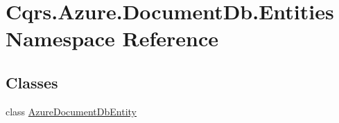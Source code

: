 \hypertarget{namespaceCqrs_1_1Azure_1_1DocumentDb_1_1Entities}{}\section{Cqrs.\+Azure.\+Document\+Db.\+Entities Namespace Reference}
\label{namespaceCqrs_1_1Azure_1_1DocumentDb_1_1Entities}
\subsection*{Classes}
\begin{DoxyCompactItemize}
\item 
class \hyperlink{classCqrs_1_1Azure_1_1DocumentDb_1_1Entities_1_1AzureDocumentDbEntity}{Azure\+Document\+Db\+Entity}
\end{DoxyCompactItemize}

